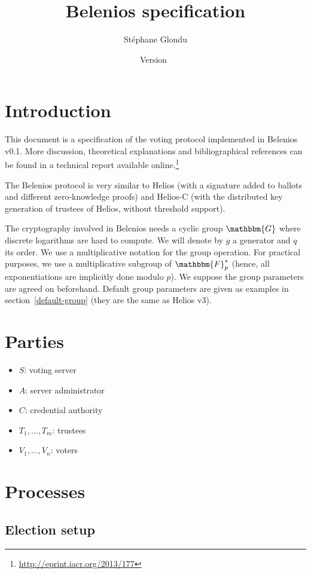 \documentclass[a4paper]{article}
\title{Belenios specification}
\date{Version~\version}
\author{Stéphane Glondu}
\newcommand{\version}{0.1}
\newcommand{\F}{\mathbbm{F}}
\newcommand{\G}{\mathbbm{G}}
\begin{document}
\maketitle
\tableofcontents

\section{Introduction}

This document is a specification of the voting protocol implemented in
Belenios v\version. More discussion, theoretical explanations and
bibliographical references can be found in a technical report
available online.\footnote{\url{http://eprint.iacr.org/2013/177}}

The Belenios protocol is very similar to Helios (with a signature
added to ballots and different zero-knowledge proofs) and Helios-C
(with the distributed key generation of trustees of Helios, without
threshold support).

The cryptography involved in Belenios needs a cyclic group $\G$ where
discrete logarithms are hard to compute. We will denote by $g$ a
generator and $q$ its order. We use a multiplicative notation for the
group operation. For practical purposes, we use a multiplicative
subgroup of $\F^*_p$ (hence, all exponentiations are implicitly done
modulo $p$). We suppose the group parameters are agreed on
beforehand. Default group parameters are given as examples in
section~\ref{default-group} (they are the same as Helios v3).

\section{Parties}

\begin{itemize}
\item $S$: voting server
\item $A$: server administrator
\item $C$: credential authority
\item $T_1,\dots,T_m$: trustees
\item $V_1,\dots,V_n$: voters
\end{itemize}

\section{Processes}
\label{processes}

\subsection{Election setup}
\label{election-setup}
\end{document}
